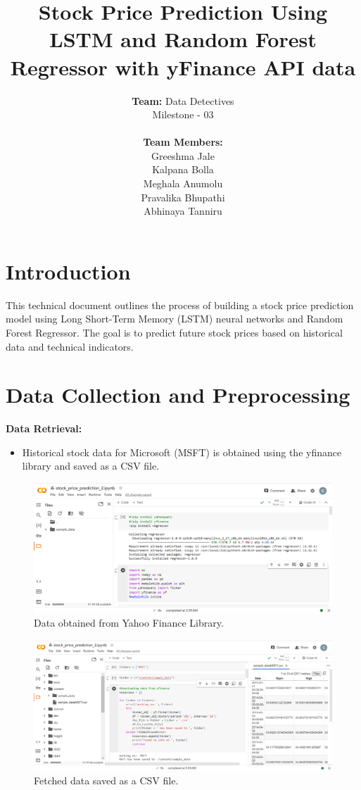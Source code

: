 \documentclass{article}
\title{Stock Price Prediction Using LSTM and Random
Forest Regressor with yFinance API data}
\author{ {\bfseries Team:}  Data Detectives \\ Milestone - 03 \\ \\ {\bfseries Team Members:} \\Greeshma Jale\\ Kalpana Bolla \\Meghala Anumolu\\Pravalika Bhupathi \\ Abhinaya Tanniru}
\begin{document}
\maketitle

\section{Introduction}
This technical document outlines the process of building a stock price prediction
model using Long Short-Term Memory (LSTM) neural networks and Random
Forest Regressor. The goal is to predict future stock prices based on historical
data and technical indicators.

\section{Data Collection and Preprocessing}

 {\bfseries Data Retrieval:} 
\begin{itemize}

  \item Historical stock data for Microsoft (MSFT) is obtained using the yfinance library and saved as a CSV file.

\end{itemize}
\begin{figure}
    \centering
    \includegraphics[width=1\linewidth]{Capture1.PNG}
    \caption{Data obtained from Yahoo Finance Library.}
    \label{fig:enter-label}
\end{figure}
     
\begin{figure}
    \centering
    \includegraphics[width=1\linewidth]{Capture2.PNG}
    \caption{Fetched data saved as a CSV file.}
    \label{fig:enter-label}
\end{figure}
\end{document}
